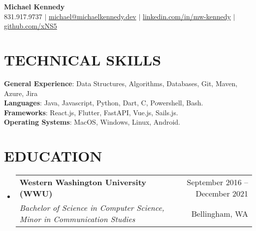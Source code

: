 \documentclass[letterpaper,11pt]{article}
\makeatletter
\newcommand{\resumeSubheading}[4]{
  \vspace{-1pt}\item
    \begin{tabular*}{\textwidth}[t]{l@{\extracolsep{\fill}}r}
      \textbf{#1} & {\color{dark-grey}\small #2}\vspace{1pt}\\ %
      \textit{#3} & {\color{dark-grey} \small #4}\\ %
    \end{tabular*}\vspace{-4pt}
}
\newcommand{\resumeSubHeadingListStart}{\begin{itemize}[leftmargin=0in, label={}]}
\newcommand{\resumeSubHeadingListEnd}{\end{itemize}}
\makeatother
\begin{document}

\begin{center}

    \textbf{\Huge Michael Kennedy} \\ \vspace{5pt}
    \small \faPhone \hspace{2pt} 831.917.9737 \hspace{1pt} $|$
    \hspace{1pt} \faEnvelope \hspace{2pt} \href{mailto:michael@michaelkennedy.dev}{michael@michaelkennedy.dev} \hspace{1pt} $|$ 
    \hspace{1pt} \faLinkedinSquare \hspace{2pt} \href{https://www.linkedin.com/in/mw-kennedy}{linkedin.com/in/mw-kennedy} \hspace{1pt}$|$
    \hspace{1pt} \faGithubSquare \hspace{2pt} \href{https://github.com/xNS5}{github.com/xNS5}
    \\ \vspace{-3pt}
\end{center}

\section{TECHNICAL SKILLS}
 \begin{itemize}[leftmargin=0in, label={}]
    \small{\item{
    \textbf{General Experience}{: Data Structures, Algorithms, Databases, Git, Maven, Azure, Jira}\\
     \textbf{Languages}{: Java, Javascript, Python, Dart, C, Powershell, Bash.} \\
     \textbf{Frameworks}{: React.js, Flutter, FastAPI, Vue.js, Sails.js.}\\
     \textbf{Operating Systems}{: MacOS, Windows, Linux, Android.}
    }}
 \end{itemize}
 
\section {EDUCATION}
  \resumeSubHeadingListStart
    \resumeSubheading
      {Western Washington University (WWU)}{September 2016 -- December 2021}
      {Bachelor of Science in Computer Science, Minor in Communication Studies}{Bellingham, WA} 
  \resumeSubHeadingListEnd
\end{document}
